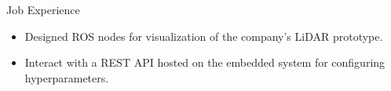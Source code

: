 \begin{rubric}{Job Experience}
\begin{itemize}
	\setlength{\itemsep}{\CVItemizeSpacing}
	\item Designed ROS nodes for visualization of the company's LiDAR prototype.  
	\item Interact with a REST API hosted on the embedded system for configuring hyperparameters.
\end{itemize}
\begin{comment}
%
%
\entry*[] \textbf{Creative Edge LLC} \hfill \textit{Software Engineer} \newline
08.2017 -- 09.2018 \hfill Denver, USA \newline
\vspace{\CVItemizeHeaderSpacing} \begin{itemize} %
	\setlength{\itemsep}{\CVItemizeSpacing}
	\item Developed applications for cryptocurrency mining in both Windows and Linux.  
	\item Wrote software managing OS drivers, system configurations, and 3rd party tools.
\end{itemize}
	content...
\end{comment}
\end{rubric}
